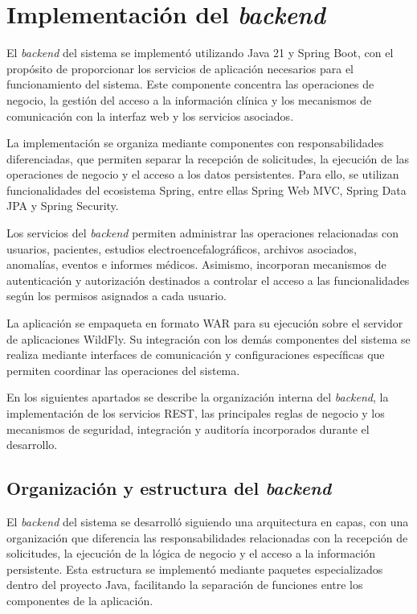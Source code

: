 \section{Implementación del \textit{backend}}

El \textit{backend} del sistema se implementó utilizando Java 21
y Spring Boot, con el propósito de proporcionar los
servicios de aplicación necesarios para el funcionamiento
del sistema. Este componente concentra las operaciones
de negocio, la gestión del acceso a la información
clínica y los mecanismos de comunicación con la
interfaz web y los servicios asociados.

La implementación se organiza mediante componentes
con responsabilidades diferenciadas, que permiten
separar la recepción de solicitudes, la ejecución
de las operaciones de negocio y el acceso a los
datos persistentes. Para ello, se utilizan
funcionalidades del ecosistema Spring, entre ellas
Spring Web MVC, Spring Data JPA y Spring Security.

Los servicios del \textit{backend} permiten administrar
las operaciones relacionadas con usuarios,
pacientes, estudios electroencefalográficos,
archivos asociados, anomalías, eventos e informes
médicos. Asimismo, incorporan mecanismos de
autenticación y autorización destinados a
controlar el acceso a las funcionalidades
según los permisos asignados a cada usuario.

La aplicación se empaqueta en formato WAR para
su ejecución sobre el servidor de aplicaciones
WildFly. Su integración con los demás componentes
del sistema se realiza mediante interfaces de
comunicación y configuraciones específicas
que permiten coordinar las operaciones del sistema.

En los siguientes apartados se describe la
organización interna del \textit{backend}, la implementación
de los servicios REST, las principales reglas
de negocio y los mecanismos de seguridad,
integración y auditoría incorporados durante
el desarrollo.


\subsection{Organización y estructura del \textit{backend}}

El \textit{backend} del sistema se desarrolló siguiendo una
arquitectura en capas, con una organización que
diferencia las responsabilidades relacionadas con
la recepción de solicitudes, la ejecución de la
lógica de negocio y el acceso a la información
persistente. Esta estructura se implementó mediante
paquetes especializados dentro del proyecto Java,
facilitando la separación de funciones entre los
componentes de la aplicación.

